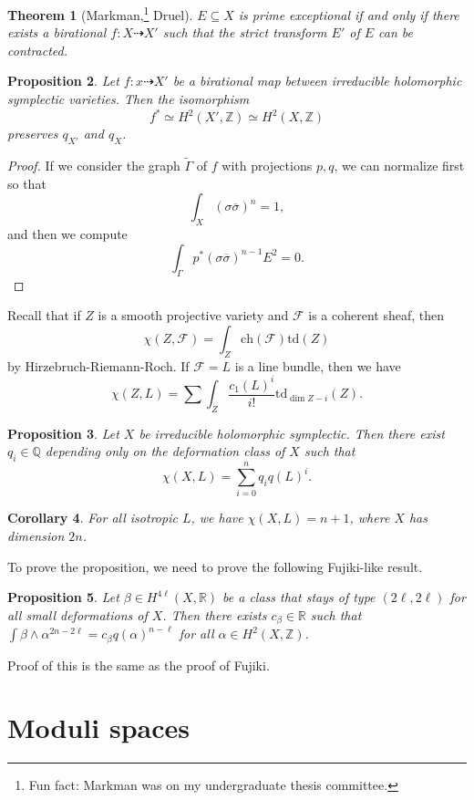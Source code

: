 \documentclass[leqno, openany]{memoir}
\newtheorem{thm}{Theorem}[section]
\newtheorem{cor}[thm]{Corollary}
\newtheorem{prop}[thm]{Proposition}
\theoremstyle{definition}
\theoremstyle{remark}
\theoremstyle{plain}
\theoremstyle{definition}
\theoremstyle{remark}
\newcommand{\R}{\mathbb{R}}
\newcommand{\Z}{\mathbb{Z}}
\newcommand{\Q}{\mathbb{Q}}
\newcommand{\mc}[1]{\mathcal{#1}}
\newcommand{\mr}[1]{\mathrm{#1}}
\newcommand{\ol}[1]{\overline{#1}}
\newcommand{\wt}[1]{\widetilde{#1}}
\begin{document}
\begin{thm}[Markman,\footnote{Fun fact: Markman was on my undergraduate thesis committee.} Druel]
    $E \subseteq X$ is prime exceptional if and only if there exists a birational $f \colon X \dashrightarrow X'$ such that the strict transform $E'$ of $E$ can be contracted.
\end{thm}

\begin{prop}
    Let $f \colon x \dashrightarrow X'$ be a birational map between irreducible holomorphic symplectic varieties. Then the isomorphism
    \[ f^* \simeq H^2(X', \Z) \simeq H^2(X, \Z) \]
    preserves $q_{X'}$ and $q_X$.
\end{prop}

\begin{proof}
    If we consider the graph $\wt{\Gamma}$ of $f$ with projections $p, q$, we can normalize first so that 
    \[ \int_X (\sigma \ol{\sigma})^n = 1, \]
    and then we compute
    \[ \int_{\Gamma} p^*(\sigma \ol{\sigma})^{n-1} E^2 = 0. \]
\end{proof}

Recall that if $Z$ is a smooth projective variety and $\mc{F}$ is a coherent sheaf, then
\[ \chi(Z, \mc{F}) = \int_Z \mr{ch}(\mc{F}) \mr{td}(Z) \]
by Hirzebruch-Riemann-Roch. If $\mc{F} = L$ is a line bundle, then we have
\[ \chi(Z, L) = \sum \int_Z \frac{c_1(L)^i}{i!} \mr{td}_{\dim Z - i}(Z). \]

\begin{prop}
    Let $X$ be irreducible holomorphic symplectic. Then there exist $q_i \in \Q$ depending only on the deformation class of $X$ such that
    \[ \chi(X, L) = \sum_{i=0}^n q_i q(L)^i. \]
\end{prop}

\begin{cor}
    For all isotropic $L$, we have $\chi(X, L) = n+1$, where $X$ has dimension $2n$.
\end{cor}

To prove the proposition, we need to prove the following Fujiki-like result.
\begin{prop}
    Let $\beta \in H^{4\ell}(X, \R)$ be a class that stays of type $(2\ell, 2\ell)$ for all small deformations of $X$. Then there exists $c_{\beta} \in \R$ such that $\int \beta \wedge \alpha^{2n-2\ell} = c_{\beta} q(\alpha)^{n-\ell}$ for all $\alpha \in H^2(X, \Z)$.
\end{prop}
Proof of this is the same as the proof of Fujiki.

\chapter{Moduli spaces}%
\label{cha:moduli_spaces}
\end{document}

